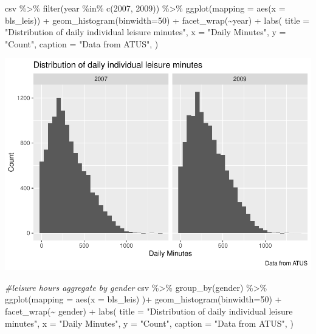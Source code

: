 \documentclass[
]{article}
\newenvironment{Shaded}{\begin{snugshade}}{\end{snugshade}}
\newcommand{\AttributeTok}[1]{\textcolor[rgb]{0.77,0.63,0.00}{#1}}
\newcommand{\CommentTok}[1]{\textcolor[rgb]{0.56,0.35,0.01}{\textit{#1}}}
\newcommand{\DecValTok}[1]{\textcolor[rgb]{0.00,0.00,0.81}{#1}}
\newcommand{\FunctionTok}[1]{\textcolor[rgb]{0.00,0.00,0.00}{#1}}
\newcommand{\NormalTok}[1]{#1}
\newcommand{\SpecialCharTok}[1]{\textcolor[rgb]{0.00,0.00,0.00}{#1}}
\newcommand{\StringTok}[1]{\textcolor[rgb]{0.31,0.60,0.02}{#1}}
\begin{document}
\begin{Shaded}
\begin{Highlighting}[]
\NormalTok{csv }\SpecialCharTok{\%\textgreater{}\%}
  \FunctionTok{filter}\NormalTok{(year }\SpecialCharTok{\%in\%} \FunctionTok{c}\NormalTok{(}\DecValTok{2007}\NormalTok{, }\DecValTok{2009}\NormalTok{)) }\SpecialCharTok{\%\textgreater{}\%}
  \FunctionTok{ggplot}\NormalTok{(}\AttributeTok{mapping =} \FunctionTok{aes}\NormalTok{(}\AttributeTok{x =}\NormalTok{ bls\_leis)) }\SpecialCharTok{+}
  \FunctionTok{geom\_histogram}\NormalTok{(}\AttributeTok{binwidth=}\DecValTok{50}\NormalTok{) }\SpecialCharTok{+}
  \FunctionTok{facet\_wrap}\NormalTok{(}\SpecialCharTok{\textasciitilde{}}\NormalTok{year) }\SpecialCharTok{+}
  \FunctionTok{labs}\NormalTok{(}
  \AttributeTok{title =} \StringTok{"Distribution of daily individual leisure minutes"}\NormalTok{,}
  \AttributeTok{x =} \StringTok{"Daily Minutes"}\NormalTok{,}
  \AttributeTok{y =} \StringTok{"Count"}\NormalTok{,}
  \AttributeTok{caption =} \StringTok{"Data from ATUS"}\NormalTok{,}
\NormalTok{)}
\end{Highlighting}
\end{Shaded}

\includegraphics{Paper2_files/figure-latex/graphs-2.pdf}

\begin{Shaded}
\begin{Highlighting}[]
\CommentTok{\#leisure hours aggregate by gender}
\NormalTok{csv }\SpecialCharTok{\%\textgreater{}\%}
  \FunctionTok{group\_by}\NormalTok{(gender) }\SpecialCharTok{\%\textgreater{}\%}
  \FunctionTok{ggplot}\NormalTok{(}\AttributeTok{mapping =} \FunctionTok{aes}\NormalTok{(}\AttributeTok{x =}\NormalTok{ bls\_leis) )}\SpecialCharTok{+}
  \FunctionTok{geom\_histogram}\NormalTok{(}\AttributeTok{binwidth=}\DecValTok{50}\NormalTok{) }\SpecialCharTok{+}
  \FunctionTok{facet\_wrap}\NormalTok{(}\SpecialCharTok{\textasciitilde{}}\NormalTok{ gender) }\SpecialCharTok{+}
    \FunctionTok{labs}\NormalTok{(}
  \AttributeTok{title =} \StringTok{"Distribution of daily individual leisure minutes"}\NormalTok{,}
  \AttributeTok{x =} \StringTok{"Daily Minutes"}\NormalTok{,}
  \AttributeTok{y =} \StringTok{"Count"}\NormalTok{,}
  \AttributeTok{caption =} \StringTok{"Data from ATUS"}\NormalTok{,}
\NormalTok{)}
\end{Highlighting}
\end{Shaded}
\end{document}
